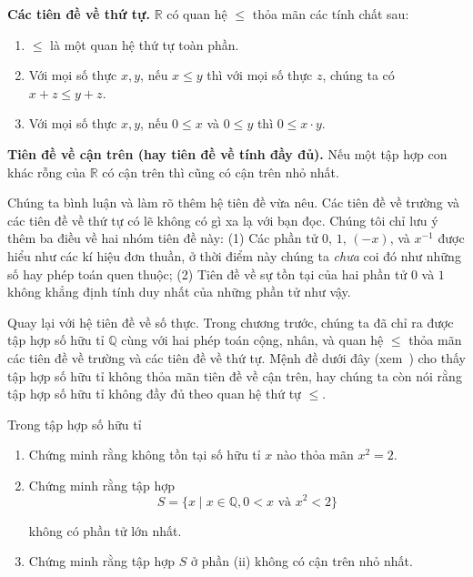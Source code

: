 \begin{axiom}
    \textbf{Các tiên đề về thứ tự.} $\mathbb{R}$ có quan hệ $\leq$ thỏa mãn các tính chất sau:
    \begin{enumerate}[label={(\roman*)}]
        \item $\leq$ là một quan hệ thứ tự toàn phần.
        \item Với mọi số thực $x, y$, nếu $x\leq y$ thì với mọi số thực $z$, chúng ta có $x + z\leq y + z$.
        \item Với mọi số thực $x, y$, nếu $0\leq x$ và $0\leq y$ thì $0\leq x\cdot y$.
    \end{enumerate}

    \textbf{Tiên đề về cận trên (hay tiên đề về tính đầy đủ).} Nếu một tập hợp con khác rỗng của $\mathbb{R}$ có cận trên thì cũng có cận trên nhỏ nhất.
\end{axiom}

Chúng ta bình luận và làm rõ thêm hệ tiên đề vừa nêu. Các tiên đề về trường và các tiên đề về thứ tự có lẽ không có gì xa lạ với bạn đọc. Chúng tôi chỉ lưu ý thêm ba điều về hai nhóm tiên đề này: (1) Các phần tử $0$, $1$, $(-x)$, và $x^{-1}$ được hiểu như các kí hiệu đơn thuần, ở thời điểm này chúng ta \textit{chưa} coi đó như những số hay phép toán quen thuộc; (2) Tiên đề về sự tồn tại của hai phần tử $0$ và $1$ không khẳng định tính duy nhất của những phần tử như vậy.

Quay lại với hệ tiên đề về số thực. Trong chương trước, chúng ta đã chỉ ra được tập hợp số hữu tỉ $\mathbb{Q}$ cùng với hai phép toán cộng, nhân, và quan hệ $\leq$ thỏa mãn các tiên đề về trường và các tiên đề về thứ tự. Mệnh đề dưới đây (xem~\cite{spivak}) cho thấy tập hợp số hữu tỉ không thỏa mãn tiên đề về cận trên, hay chúng ta còn nói rằng tập hợp số hữu tỉ không đầy đủ theo quan hệ thứ tự $\leq$.

\begin{proposition}\label{proposition:irrational-cut}
    Trong tập hợp số hữu tỉ
    \begin{enumerate}[label={(\roman*)}]
        \item Chứng minh rằng không tồn tại số hữu tỉ $x$ nào thỏa mãn $x^{2} = 2$.
        \item Chứng minh rằng tập hợp
              \[
                  S = \{ x \mid x\in\mathbb{Q}, 0 < x \text{ và } x^{2} < 2 \}
              \]

              không có phần tử lớn nhất.
        \item Chứng minh rằng tập hợp $S$ ở phần (ii) không có cận trên nhỏ nhất.
    \end{enumerate}
\end{proposition}

